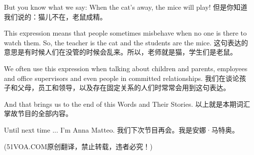 But you know what we say: When the cat's away, the mice will play!
但是你知道我们说的：猫儿不在，老鼠成精。

This expression means that people sometimes misbehave when no one is there to watch them. So, the teacher is the cat and the students are the mice.
这句表达的意思是有时候人们在没管的时候会乱来。所以，老师就是猫，学生们是老鼠。

We often use this expression when talking about children and parents, employees and office supervisors and even people in committed relationships.
我们在谈论孩子和父母，员工和领导，以及存在固定关系的人们时常常会用到这句表达。

And that brings us to the end of this Words and Their Stories.
以上就是本期词汇掌故节目的全部内容。

Until next time ... I'm Anna Matteo.
我们下次节目再会。我是安娜·马特奥。

(51VOA.COM原创翻译，禁止转载，违者必究！)

